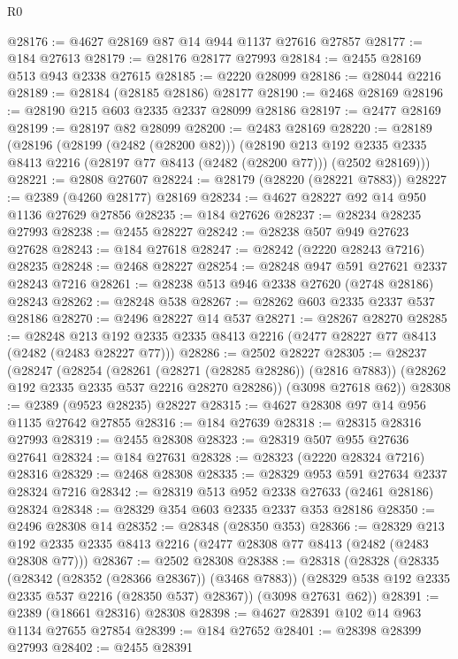 \begin{lexlean}{R0}
\begin{coremodule}
@28176 := @4627 @28169 @87 @14 @944 @1137 @27616 @27857
@28177 := @184 @27613
@28179 := @28176 @28177 @27993
@28184 := @2455 @28169 @513 @943 @2338 @27615
@28185 := @2220 @28099
@28186 := @28044 @2216
@28189 := @28184 (@28185 @28186) @28177
@28190 := @2468 @28169
@28196 := @28190 @215 @603 @2335 @2337 @28099 @28186
@28197 := @2477 @28169
@28199 := @28197 @82 @28099
@28200 := @2483 @28169
@28220 := @28189
    (@28196
      (@28199 (@2482 (@28200 @82)))
      (@28190
        @213
        @192
        @2335
        @2335
        @8413
        @2216
        (@28197 @77 @8413 (@2482 (@28200 @77)))
        (@2502 @28169)))
@28221 := @2808 @27607
@28224 := @28179 (@28220 (@28221 @7883))
@28227 := @2389 (@4260 @28177) @28169
@28234 := @4627 @28227 @92 @14 @950 @1136 @27629 @27856
@28235 := @184 @27626
@28237 := @28234 @28235 @27993
@28238 := @2455 @28227
@28242 := @28238 @507 @949 @27623 @27628
@28243 := @184 @27618
@28247 := @28242 (@2220 @28243 @7216) @28235
@28248 := @2468 @28227
@28254 := @28248 @947 @591 @27621 @2337 @28243 @7216
@28261 := @28238 @513 @946 @2338 @27620 (@2748 @28186) @28243
@28262 := @28248 @538
@28267 := @28262 @603 @2335 @2337 @537 @28186
@28270 := @2496 @28227 @14 @537
@28271 := @28267 @28270
@28285 := @28248
    @213
    @192
    @2335
    @2335
    @8413
    @2216
    (@2477 @28227 @77 @8413 (@2482 (@2483 @28227 @77)))
@28286 := @2502 @28227
@28305 := @28237
    (@28247
      (@28254
        (@28261 (@28271 (@28285 @28286)) (@2816 @7883))
        (@28262 @192 @2335 @2335 @537 @2216 @28270 @28286))
      (@3098 @27618 @62))
@28308 := @2389 (@9523 @28235) @28227
@28315 := @4627 @28308 @97 @14 @956 @1135 @27642 @27855
@28316 := @184 @27639
@28318 := @28315 @28316 @27993
@28319 := @2455 @28308
@28323 := @28319 @507 @955 @27636 @27641
@28324 := @184 @27631
@28328 := @28323 (@2220 @28324 @7216) @28316
@28329 := @2468 @28308
@28335 := @28329 @953 @591 @27634 @2337 @28324 @7216
@28342 := @28319 @513 @952 @2338 @27633 (@2461 @28186) @28324
@28348 := @28329 @354 @603 @2335 @2337 @353 @28186
@28350 := @2496 @28308 @14
@28352 := @28348 (@28350 @353)
@28366 := @28329
    @213
    @192
    @2335
    @2335
    @8413
    @2216
    (@2477 @28308 @77 @8413 (@2482 (@2483 @28308 @77)))
@28367 := @2502 @28308
@28388 := @28318
    (@28328
      (@28335
        (@28342 (@28352 (@28366 @28367)) (@3468 @7883))
        (@28329 @538 @192 @2335 @2335 @537 @2216 (@28350 @537) @28367))
      (@3098 @27631 @62))
@28391 := @2389 (@18661 @28316) @28308
@28398 := @4627 @28391 @102 @14 @963 @1134 @27655 @27854
@28399 := @184 @27652
@28401 := @28398 @28399 @27993
@28402 := @2455 @28391

\end{coremodule}
\end{lexlean}
